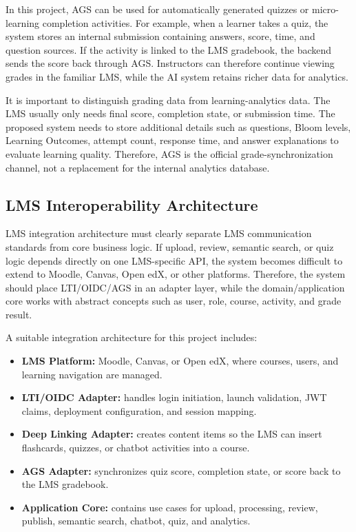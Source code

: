 In this project, AGS can be used for automatically generated quizzes or
micro-learning completion activities. For example, when a learner takes a
quiz, the system stores an internal submission containing answers, score,
time, and question sources. If the activity is linked to the LMS
gradebook, the backend sends the score back through AGS. Instructors can
therefore continue viewing grades in the familiar LMS, while the AI system
retains richer data for analytics.

It is important to distinguish grading data from learning-analytics data.
The LMS usually only needs final score, completion state, or submission
time. The proposed system needs to store additional details such as
questions, Bloom levels, Learning Outcomes, attempt count, response time,
and answer explanations to evaluate learning quality. Therefore, AGS is
the official grade-synchronization channel, not a replacement for the
internal analytics database.

\subsection{LMS Interoperability Architecture}
\label{subsec:lms-interoperability-architecture}

LMS integration architecture must clearly separate LMS communication
standards from core business logic. If upload, review, semantic search, or
quiz logic depends directly on one LMS-specific API, the system becomes
difficult to extend to Moodle, Canvas, Open edX, or other platforms.
Therefore, the system should place LTI/OIDC/AGS in an adapter layer, while
the domain/application core works with abstract concepts such as user,
role, course, activity, and grade result.

A suitable integration architecture for this project includes:

\begin{itemize}
    \item \textbf{LMS Platform:} Moodle, Canvas, or Open edX, where
          courses, users, and learning navigation are managed.
    \item \textbf{LTI/OIDC Adapter:} handles login initiation, launch
          validation, JWT claims, deployment configuration, and session
          mapping.
    \item \textbf{Deep Linking Adapter:} creates content items so the LMS
          can insert flashcards, quizzes, or chatbot activities into a
          course.
    \item \textbf{AGS Adapter:} synchronizes quiz score, completion
          state, or score back to the LMS gradebook.
    \item \textbf{Application Core:} contains use cases for upload,
          processing, review, publish, semantic search, chatbot, quiz, and
          analytics.
\end{itemize}

